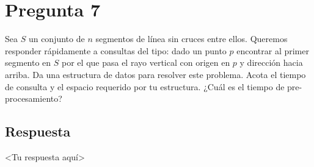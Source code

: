 \section*{Pregunta 7}
\noindent Sea $S$ un conjunto de $n$ segmentos de línea sin cruces entre ellos.
  Queremos responder rápidamente a consultas del tipo: dado un punto $p$ encontrar al primer segmento en $S$ por el que pasa el rayo vertical con origen en $p$ y dirección hacia arriba.
  Da una estructura de datos para resolver este problema.
  Acota el tiempo de consulta y el espacio requerido por tu estructura.
  ¿Cuál es el tiempo de pre-procesamiento?

\subsection*{Respuesta}
<Tu respuesta aquí>

\bigskip
